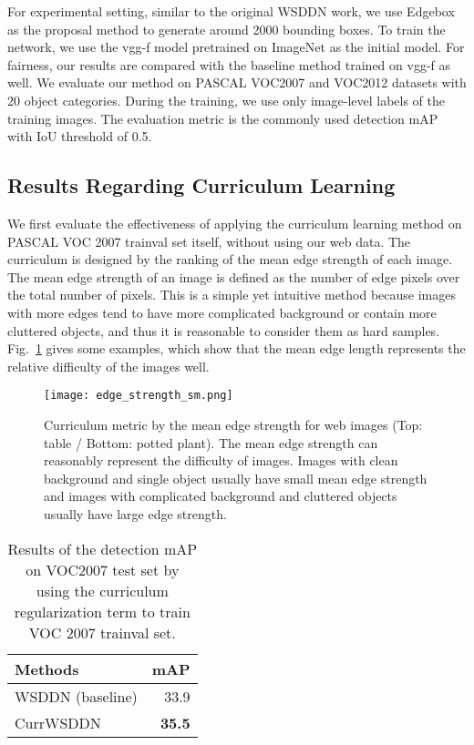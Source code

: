 \documentclass[10pt,twocolumn,letterpaper]{article}
\begin{document}
For experimental setting, similar to the original WSDDN work, we use Edgebox~\cite{zitnick2014edge} as the proposal method to generate around 2000 bounding boxes. To train the network, we use the vgg-f model pretrained on ImageNet as the initial model. For fairness, our results are compared with the baseline method trained on vgg-f as well. 
We evaluate our method on PASCAL VOC2007 and VOC2012 datasets with 20 object categories. During the training, we use only image-level labels of the training images. The evaluation metric is the commonly used detection mAP with IoU threshold of 0.5.

\subsection {Results Regarding Curriculum Learning}
We first evaluate the effectiveness of applying the curriculum learning method on PASCAL VOC 2007 trainval set itself, without using our web data. The curriculum is designed by the ranking of the mean edge strength of each image. The mean edge strength of an image is defined as the number of edge pixels over the total number of pixels. This is a simple yet intuitive method because images with more edges tend to have more complicated background or contain more cluttered objects, and thus it is reasonable to consider them as hard samples. Fig.~\ref{fig:edge_strength} gives some examples, which show that the mean edge length represents the relative difficulty of the images well.

\begin{figure}
\texttt{[image: edge\_strength\_sm.png]}
\caption{Curriculum metric by the mean edge strength for web images (Top: table / Bottom: potted plant). The mean edge strength can reasonably represent the difficulty of images. Images with clean background and single object usually have small mean edge strength and images with complicated background and cluttered objects usually have large edge strength.}
\label{fig:edge_strength}
\end{figure}

\begin{table}
\centering
\caption{Results of the detection mAP on VOC2007 test set by using the curriculum regularization term to train VOC 2007 trainval set. } \label{tb:CurrWSDDN}
\begin{tabular}{| l | r | }
\hline
Methods & mAP\\ \hline \hline
WSDDN (baseline)    & 33.9 \\ \hline
CurrWSDDN   & \textbf{35.5} \\ \hline
\end{tabular}
\end{table}
\end{document}
